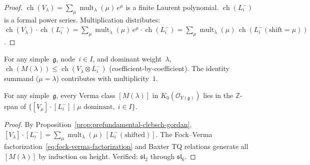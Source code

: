 \begin{proof}
$\operatorname{ch}(V_\lambda) = \sum_\mu
\operatorname{mult}_\lambda(\mu)\, e^\mu$ is a finite Laurent
polynomial. $\operatorname{ch}(L^-_i)$ is a formal power series.
Multiplication distributes:
$\operatorname{ch}(V_\lambda) \cdot \operatorname{ch}(L^-_i)
= \sum_\mu \operatorname{mult}_\lambda(\mu)\,
 e^\mu \cdot \operatorname{ch}(L^-_i)
= \sum_\mu \operatorname{mult}_\lambda(\mu)\,
 \operatorname{ch}(L^-_i(\mathrm{shift} = \mu))$.
\end{proof}

\begin{corollary}
\label{cor:universal-character-containment}%
%
For any simple~$\mathfrak{g}$, node~$i \in I$, and dominant
weight~$\lambda$,
$\operatorname{ch}(M(\lambda))
\leq
\operatorname{ch}(V_\lambda \otimes L^-_i)$
\textup{(coefficient-by-coefficient)}.
The identity summand ($\mu = \lambda$) contributes with
multiplicity~$1$.
\end{corollary}

\begin{corollary}
\label{cor:k0-generation-OY}%
%
%
%
For any simple~$\mathfrak{g}$, every Verma class
$[M(\lambda)]$ in
$K_0(\mathcal{O}_{Y(\mathfrak{g})})$ lies in the
$\mathbb{Z}$-span of\/
$\{[V_\mu] \cdot [L^-_i] \mid \mu\text{ dominant},\; i \in I\}$.
\end{corollary}

\begin{proof}
By Proposition~\ref{prop:prefundamental-clebsch-gordan},
$[V_\lambda] \cdot [L^-_i] = \sum_\mu
\operatorname{mult}_\lambda(\mu)\, [L^-_i(\mathrm{shifted})]$.
The Fock--Verma factorization~\eqref{eq:fock-verma-factorization}
and Baxter TQ relations generate all $[M(\lambda)]$ by induction
on height.
Verified: $\mathfrak{sl}_2$ through $\mathfrak{sl}_6$.
\end{proof}

